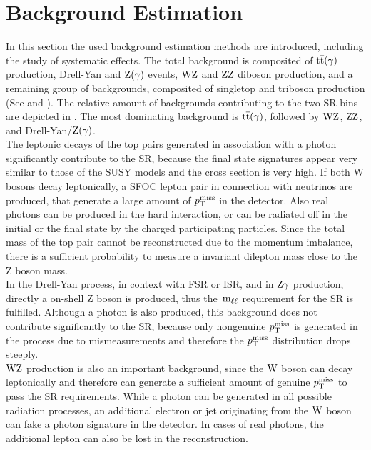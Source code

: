 \section{Background Estimation}\label{sec:BKG}
In this section the used background estimation methods are introduced, including the study of systematic effects. The total background is composited of ${\mathrm{t}\overline{\mathrm{t}}}(\gamma)$ production, Drell-Yan and $\mathrm{Z}(\gamma)$ events, $\mathrm{W}\mathrm{Z}$ and $\mathrm{Z}\mathrm{Z}$ diboson production, and a remaining group of backgrounds, composited of \eg singletop and triboson production (See  and ). The relative amount of backgrounds contributing to the two SR bins are depicted in . The most dominating background is ${\mathrm{t}\overline{\mathrm{t}}}(\gamma)$, followed by $\mathrm{W}\mathrm{Z}$, $\mathrm{Z}\mathrm{Z}$, and Drell-Yan/$\mathrm{Z}(\gamma)$.\\
The leptonic decays of the top pairs generated in association with a photon significantly contribute to the SR, because the final state signatures appear very similar to those of the SUSY models and the cross section is very high. If both W bosons decay leptonically, a SFOC lepton pair in connection with neutrinos are produced, that generate a large amount of $p_{\mathrm{T}}^\text{miss}$ in the detector. Also real photons can be produced in the hard interaction, or can be radiated off in the initial or the final state by the charged participating particles. Since the total mass of the top pair cannot be reconstructed due to the momentum imbalance, there is a sufficient probability to measure a invariant dilepton mass close to the Z boson mass.\\
In the Drell-Yan process, in context with FSR or ISR, and in $\mathrm{Z}\gamma$ production, directly a on-shell Z boson is produced, thus the $\,\text{m}_{\ell\ell}$ requirement for the SR is fulfilled. Although a photon is also produced, this background does not contribute significantly to the SR, because only nongenuine $p_{\mathrm{T}}^\text{miss}$ is generated in the process due to mismeasurements and therefore the $p_{\mathrm{T}}^\text{miss}$ distribution drops steeply.\\
$\mathrm{W}\mathrm{Z}$ production is also an important background, since the $\mathrm{W}$ boson can decay leptonically and therefore can generate a sufficient amount of genuine $p_{\mathrm{T}}^\text{miss}$ to pass the SR requirements. While a photon can be generated in all possible radiation processes, an additional electron or jet originating from the $\mathrm{W}$ boson can fake a photon signature in the detector. In cases of real photons, the additional lepton can also be lost in the reconstruction.\\
